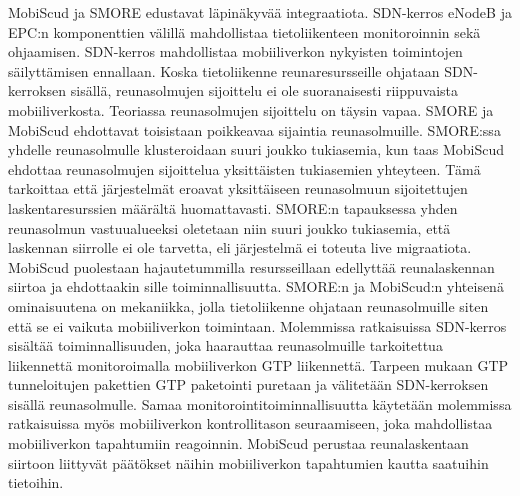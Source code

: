 MobiScud ja SMORE edustavat läpinäkyvää integraatiota.
SDN-kerros eNodeB ja EPC:n komponenttien välillä mahdollistaa tietoliikenteen monitoroinnin sekä ohjaamisen.
SDN-kerros mahdollistaa mobiiliverkon nykyisten toimintojen säilyttämisen ennallaan.
Koska tietoliikenne reunaresursseille ohjataan SDN-kerroksen sisällä, reunasolmujen sijoittelu ei ole suoranaisesti riippuvaista mobiiliverkosta.  
Teoriassa reunasolmujen sijoittelu on täysin vapaa. 
SMORE ja MobiScud ehdottavat toisistaan poikkeavaa sijaintia reunasolmuille. SMORE:ssa yhdelle reunasolmulle klusteroidaan suuri joukko tukiasemia, kun taas MobiScud ehdottaa reunasolmujen sijoittelua yksittäisten tukiasemien yhteyteen.
Tämä tarkoittaa että järjestelmät eroavat yksittäiseen reunasolmuun sijoitettujen laskentaresurssien määrältä huomattavasti.
SMORE:n tapauksessa yhden reunasolmun vastuualueeksi oletetaan niin suuri joukko tukiasemia, että laskennan siirrolle ei ole tarvetta, eli järjestelmä ei toteuta live migraatiota.
MobiScud puolestaan hajautetummilla resursseillaan edellyttää reunalaskennan siirtoa ja ehdottaakin sille toiminnallisuutta.
SMORE:n ja MobiScud:n yhteisenä ominaisuutena on mekaniikka, jolla tietoliikenne ohjataan reunasolmuille siten että se ei vaikuta mobiiliverkon toimintaan.
Molemmissa ratkaisuissa SDN-kerros sisältää toiminnallisuuden, joka haarauttaa reunasolmuille tarkoitettua liikennettä monitoroimalla mobiiliverkon GTP liikennettä.
Tarpeen mukaan GTP tunneloitujen pakettien GTP paketointi puretaan ja välitetään SDN-kerroksen sisällä reunasolmulle. 
Samaa monitorointitoiminnallisuutta käytetään molemmissa ratkaisuissa myös mobiiliverkon kontrollitason seuraamiseen, joka mahdollistaa mobiiliverkon tapahtumiin reagoinnin.
MobiScud perustaa reunalaskentaan siirtoon liittyvät päätökset näihin mobiiliverkon tapahtumien kautta saatuihin tietoihin.
%

